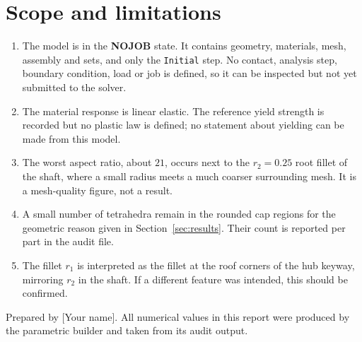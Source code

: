 \documentclass[11pt,a4paper]{article}
\newcommand{\id}[1]{\texttt{#1}}
\begin{document}
\section{Scope and limitations}
\begin{enumerate}\itemsep3pt
  \item The model is in the \textbf{NOJOB} state. It contains geometry,
        materials, mesh, assembly and sets, and only the \id{Initial} step. No
        contact, analysis step, boundary condition, load or job is defined, so it
        can be inspected but not yet submitted to the solver.
  \item The material response is linear elastic. The reference yield strength is
        recorded but no plastic law is defined; no statement about yielding can
        be made from this model.
  \item The worst aspect ratio, about $21$, occurs next to the $r_2 = 0.25$
        root fillet of the shaft, where a small radius meets a much coarser
        surrounding mesh. It is a mesh-quality figure, not a result.
  \item A small number of tetrahedra remain in the rounded cap regions for the
        geometric reason given in Section~\ref{sec:results}. Their count is
        reported per part in the audit file.
  \item The fillet $r_1$ is interpreted as the fillet at the roof corners of the
        hub keyway, mirroring $r_2$ in the shaft. If a different feature was
        intended, this should be confirmed.
\end{enumerate}

\vfill
\noindent\footnotesize
Prepared by [Your name]. All numerical values in this report were produced by the
parametric builder and taken from its audit output.
\end{document}
